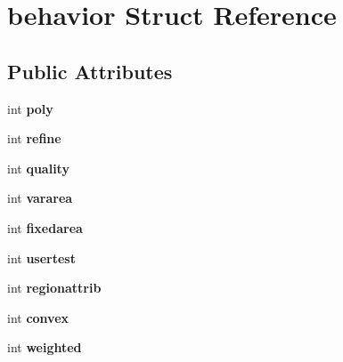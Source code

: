 \hypertarget{structbehavior}{
\section{behavior Struct Reference}
\label{structbehavior}
}
\subsection*{Public Attributes}
\begin{DoxyCompactItemize}
\item 
\hypertarget{structbehavior_a34495ca52e6406ead41e4d37758b03e4}{
int {\bfseries poly}}
\label{structbehavior_a34495ca52e6406ead41e4d37758b03e4}

\item 
\hypertarget{structbehavior_a782cbc85135e774ebaea351cab41ed2f}{
int {\bfseries refine}}
\label{structbehavior_a782cbc85135e774ebaea351cab41ed2f}

\item 
\hypertarget{structbehavior_aff272ed01675024380027f9e972d45ce}{
int {\bfseries quality}}
\label{structbehavior_aff272ed01675024380027f9e972d45ce}

\item 
\hypertarget{structbehavior_ac52f72b313e292dce59dd7554c040935}{
int {\bfseries vararea}}
\label{structbehavior_ac52f72b313e292dce59dd7554c040935}

\item 
\hypertarget{structbehavior_a3517c8cc065b15326ac2784bce0fecf7}{
int {\bfseries fixedarea}}
\label{structbehavior_a3517c8cc065b15326ac2784bce0fecf7}

\item 
\hypertarget{structbehavior_afac6b65f184f98f84724b94e06b49af3}{
int {\bfseries usertest}}
\label{structbehavior_afac6b65f184f98f84724b94e06b49af3}

\item 
\hypertarget{structbehavior_a9fc10997a6c91aaa9894d81432d9f4dc}{
int {\bfseries regionattrib}}
\label{structbehavior_a9fc10997a6c91aaa9894d81432d9f4dc}

\item 
\hypertarget{structbehavior_a136866fb4c5c376089eec0a5e305e237}{
int {\bfseries convex}}
\label{structbehavior_a136866fb4c5c376089eec0a5e305e237}

\item 
\hypertarget{structbehavior_a1dc051c2e5ab8cfd9031609da2cb22bf}{
int {\bfseries weighted}}
\label{structbehavior_a1dc051c2e5ab8cfd9031609da2cb22bf}


\end{DoxyCompactItemize}

